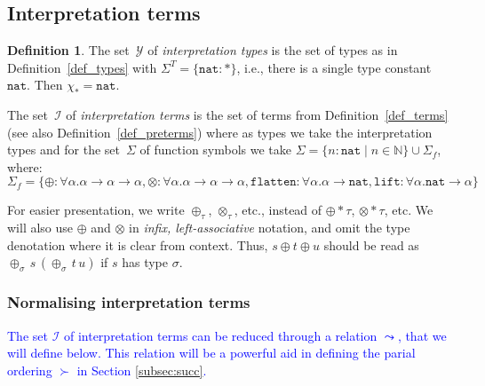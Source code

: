 \documentclass[a4paper,UKenglish,cleveref,autoref,numberwithinsect]{lipics-v2019}
\theoremstyle{definition}
\newtheorem{defn}[theorem]{Definition}
\newcommand{\Iterms}{\mathcal{I}}
\newcommand{\ITypes}{\mathcal{Y}}
\newcommand{\arrtype}{\rightarrow}
\newcommand{\tapp}[2]{#1 * #2}
\newcommand{\abs}[2]{\lambda #1.#2}
\newcommand{\arrW}{\leadsto}
\newcommand{\nat}{\mathtt{nat}}
\newcommand{\flatten}{\mathtt{flatten}}
\newcommand{\lift}{\mathtt{lift}}
\newcommand{\Nbb}{\mathbb{N}}
\newcommand{\CKchange}[1]{\textcolor{blue}{#1}}
\begin{document}

\subsection{Interpretation terms}\label{subsec:I}

\begin{defn}\label{def_iterms}
  The set~$\ITypes$ of \emph{interpretation types} is the set of types
  as in Definition~\ref{def_types} with $\Sigma^T = \{ \nat : * \}$,
  i.e., there is a single type constant~$\nat$. Then $\chi_* = \nat$.

  The set~$\Iterms$ of \emph{interpretation terms} is the set of terms
  from Definition~\ref{def_terms} (see also
  Definition~\ref{def_preterms}) where as types we take the
  interpretation types and for the set~$\Sigma$ of function symbols we
  take $\Sigma = \{ n : \nat \mid n \in \Nbb \} \cup \Sigma_f$, where:
  \[
      \Sigma_f = \{ \oplus : \forall \alpha . \alpha \arrtype
                 \alpha \arrtype \alpha, \otimes : \forall \alpha . \alpha \arrtype \alpha
                 \arrtype \alpha, \flatten : \forall \alpha . \alpha \arrtype
                 \nat, \lift : \forall \alpha . \nat \arrtype \alpha
                 \}
  \]
\end{defn}

For easier presentation, we write $\oplus_\tau$, $\otimes_\tau$, etc.,
instead of $\tapp{\oplus}{\tau}$, $\tapp{\otimes}{\tau}$, etc. We will
also use $\oplus$ and $\otimes$ in \emph{infix, left-associative}
notation, and omit the type denotation where it is clear from
context. Thus, $s \oplus t \oplus u$ should be read as
$\oplus_\sigma\,s\,(\oplus_\sigma\,t\,u)$ if $s$ has type $\sigma$.

\subsubsection{Normalising interpretation terms}

\CKchange{The set $\Iterms$ of interpretation terms can be reduced through
a relation $\arrW$, that we will define below.  This relation will
be a powerful aid in defining the parial ordering $\succ$ in Section
\ref{subsec:succ}.}
\end{document}
